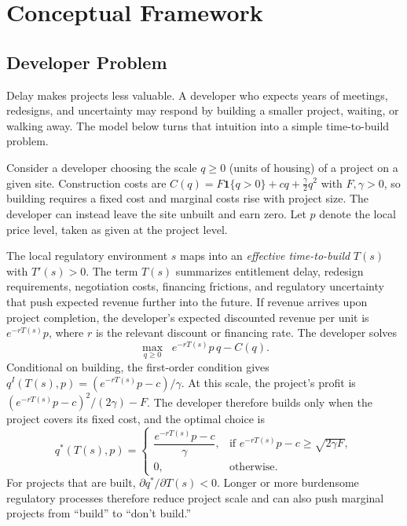 
\section{Conceptual Framework}
\label{sec:model}
\subsection{Developer Problem}

Delay makes projects less valuable.
A developer who expects years of meetings, redesigns, and uncertainty may respond by building a smaller project, waiting, or walking away.
The model below turns that intuition into a simple time-to-build problem.

Consider a developer choosing the scale $q \geq 0$ (units of housing) of a project on a given site.
Construction costs are $C(q) = F\mathbf{1}\{q>0\} + cq + \frac{\gamma}{2}q^2$ with $F,\gamma > 0$, so building requires a fixed cost and marginal costs rise with project size.
The developer can instead leave the site unbuilt and earn zero.
Let $p$ denote the local price level, taken as given at the project level.

The local regulatory environment $s$ maps into an \textit{effective time-to-build} $T(s)$ with $T'(s) > 0$.
The term $T(s)$ summarizes entitlement delay, redesign requirements, negotiation costs, financing frictions, and regulatory uncertainty that push expected revenue further into the future.
If revenue arrives upon project completion, the developer's expected discounted revenue per unit is $e^{-rT(s)} p$, where $r$ is the relevant discount or financing rate.
The developer solves
\[
\max_{q \geq 0} \;\; e^{-rT(s)} p \, q - C(q).
\]
Conditional on building, the first-order condition gives $q^I(T(s),p) = \left(e^{-rT(s)}p-c\right)/\gamma$.
At this scale, the project's profit is $\left(e^{-rT(s)}p-c\right)^2/(2\gamma)-F$.
The developer therefore builds only when the project covers its fixed cost, and the optimal choice is
\[
q^*(T(s),p) =
\begin{cases}
\dfrac{e^{-rT(s)}p-c}{\gamma},
& \text{if } e^{-rT(s)}p-c \geq \sqrt{2\gamma F}, \\
0, & \text{otherwise.}
\end{cases}
\]
For projects that are built, $\partial q^*/\partial T(s)<0$.
Longer or more burdensome regulatory processes therefore reduce project scale and can also push marginal projects from ``build'' to ``don't build.''

